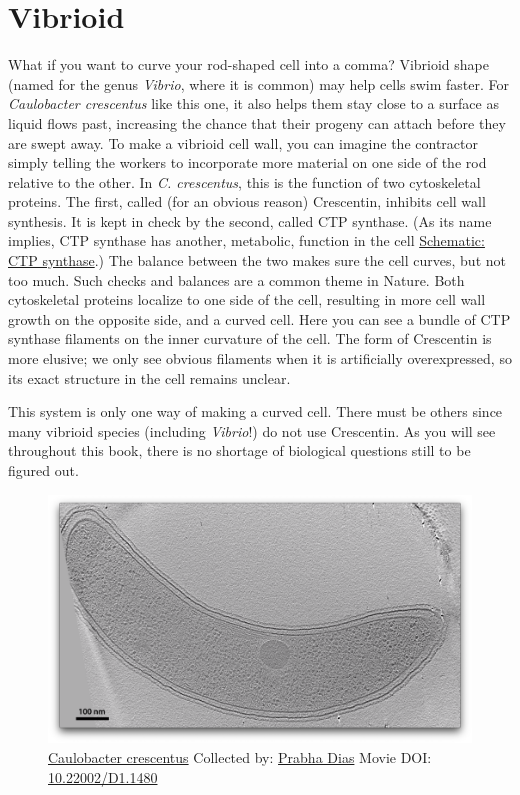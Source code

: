 \documentclass[]{tufte-book}
\begin{document}
\section{Vibrioid}\label{vibrioid}

What if you want to curve your rod-shaped cell into a comma? Vibrioid
shape (named for the genus \emph{Vibrio}, where it is common) may help
cells swim faster. For \emph{Caulobacter crescentus} like this one, it
also helps them stay close to a surface as liquid flows past, increasing
the chance that their progeny can attach before they are swept away. To
make a vibrioid cell wall, you can imagine the contractor simply telling
the workers to incorporate more material on one side of the rod relative
to the other. In \emph{C. crescentus}, this is the function of two
cytoskeletal proteins. The first, called (for an obvious reason)
Crescentin, inhibits cell wall synthesis. It is kept in check by the
second, called CTP synthase. (As its name implies, CTP synthase has
another, metabolic, function in the cell
\protect\hyperlink{CTP_synthase}{Schematic: CTP synthase}.) The balance
between the two makes sure the cell curves, but not too much. Such
checks and balances are a common theme in Nature. Both cytoskeletal
proteins localize to one side of the cell, resulting in more cell wall
growth on the opposite side, and a curved cell. Here you can see a
bundle of CTP synthase filaments on the inner curvature of the cell. The
form of Crescentin is more elusive; we only see obvious filaments when
it is artificially overexpressed, so its exact structure in the cell
remains unclear.

This system is only one way of making a curved cell. There must be
others since many vibrioid species (including \emph{Vibrio}!) do not use
Crescentin. As you will see throughout this book, there is no shortage
of biological questions still to be figured out.





\begin{figure}
\includegraphics{movie_stills/3_4} \caption[\protect\hyperlink{tree}{Caulobacter crescentus} Collected by:
\protect\hyperlink{prabha_dias}{Prabha Dias} Movie DOI:
\href{https://doi.org/10.22002/D1.1480}{10.22002/D1.1480}]{\protect\hyperlink{tree}{Caulobacter crescentus} Collected by:
\protect\hyperlink{prabha_dias}{Prabha Dias} Movie DOI:
\href{https://doi.org/10.22002/D1.1480}{10.22002/D1.1480}}\label{fig:3-4}
\end{figure}
\end{document}
